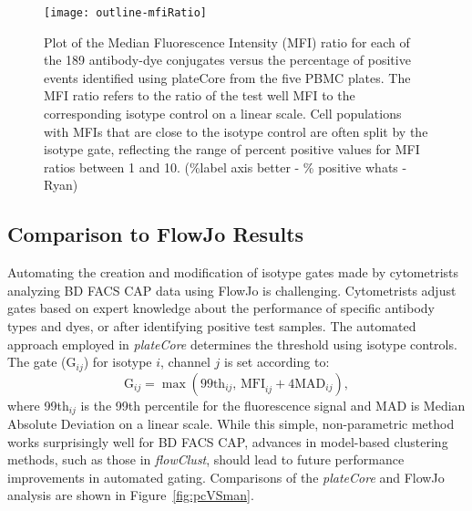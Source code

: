 \documentclass[12pt]{article}
\newcommand{\Rpackage}[1]{{\textit{#1}}}
\begin{document}
\clearpage
\begin{figure}
\centering
\texttt{[image: outline-mfiRatio]}
\caption{Plot of the Median Fluorescence Intensity (MFI) ratio for each of the
189 antibody-dye conjugates versus the percentage of positive events identified
using plateCore from the five PBMC plates. The MFI ratio refers to the ratio of
the test well MFI to the corresponding isotype control on a linear scale. Cell
populations with MFIs that are close to the isotype control are often split by
the isotype gate, reflecting the range of percent positive values for MFI
ratios between 1 and 10. (\%label axis better - \% positive whats - Ryan)}
\label{fig:mfiRatio}
\end{figure}

\clearpage
\subsection*{Comparison to FlowJo Results}
Automating the creation and modification of isotype gates made by cytometrists
analyzing BD FACS CAP data using FlowJo is challenging. Cytometrists adjust
gates based on expert knowledge about the performance of specific antibody
types and dyes, or after identifying positive test samples. The automated
approach employed in \Rpackage{plateCore} determines the threshold using
isotype controls.  The gate (G$_{ij}$) for isotype $i$, channel $j$ is set
according to:
\begin{equation}
\text{G}_{ij} = \max (\text{99th}_{ij} \text{, MFI}_{ij}+ 4 \text{MAD}_{ij}),
\label{isoGate}
\end{equation}
where 99th$_{ij}$ is the 99th percentile for the fluorescence signal and
MAD is Median Absolute Deviation on a linear scale. 
While this simple, non-parametric method works surprisingly well for BD FACS
CAP, advances in model-based clustering methods, such as those in
\Rpackage{flowClust}, should lead to future performance improvements in
automated gating. Comparisons of the \Rpackage{plateCore} and FlowJo analysis
are shown in Figure~\ref{fig:pcVSman}.
\end{document}
